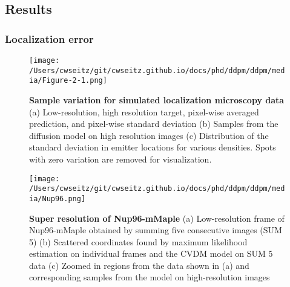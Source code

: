 

\subsection{Results}

\subsubsection{Localization error}

\begin{figure}[t]
\centering
\texttt{[image: /Users/cwseitz/git/cwseitz.github.io/docs/phd/ddpm/ddpm/media/Figure-2-1.png]}
\caption{\textbf{Sample variation for simulated localization microscopy data} (a) Low-resolution, high resolution target, pixel-wise averaged prediction, and pixel-wise standard deviation (b) Samples from the diffusion model on high resolution images (c) Distribution of the standard deviation in emitter locations for various densities. Spots with zero variation are removed for visualization. }
\label{fig:locobayes}
\end{figure}

\begin{figure}[t]
\centering
\texttt{[image: /Users/cwseitz/git/cwseitz.github.io/docs/phd/ddpm/ddpm/media/Nup96.png]}
\caption{\textbf{Super resolution of Nup96-mMaple} (a) Low-resolution frame of Nup96-mMaple obtained by summing five consecutive images (SUM 5) (b) Scattered coordinates found by maximum likelihood estimation on individual frames and the CVDM model on SUM 5 data (c) Zoomed in regions from the data shown in (a) and corresponding samples from the model on high-resolution images}
\label{fig:nup96}
\end{figure}


